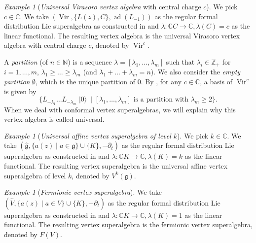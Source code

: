 \documentclass[a4paper, 12pt, reqno]{amsart}
\theoremstyle{remark}
\newtheorem{example}[theorem]{Example}
\numberwithin{equation}{subsection}
\DeclareMathOperator{\Vir}{Vir}
\DeclareMathOperator{\vac}{|0\rangle}
\DeclareMathOperator{\ad}{ad}
\begin{document}
\begin{example}[\emph{Universal Virasoro vertex algebra} with central charge $c$]
  \label{exa:5}
  We pick $c \in \mathbb{C}$.
  We take $(\Vir, \{L(z), C\}, \ad(L_{-1}))$ as the regular formal distribution Lie superalgebra as constructed in  and $\lambda: \mathbb{C}C \to \mathbb{C}, \lambda(C) = c$ as the linear functional.
  The resulting vertex algebra is the universal Virasoro vertex algebra with central charge $c$, denoted by $\Vir^c$.

  A \emph{partition} (of $n \in \mathbb{N}$) is a sequence $\lambda = [\lambda_1, \dots, \lambda_m]$ such that $\lambda_i \in \mathbb{Z}_+$ for $i = 1, \dots, m$, $\lambda_1 \ge \dots \ge \lambda_m$ (and $\lambda_1 + \dots + \lambda_m = n$).
  We also consider the \emph{empty partition} $\emptyset$, which is the unique partition of $0$.
  By , for any $c \in \mathbb{C}$, a basis of $\Vir^c$ is given by
  \begin{equation*}
    \{L_{-\lambda_1}\dots L_{-\lambda_m}\vac \mid [\lambda_1, \dots, \lambda_m]\text{ is a partition with }\lambda_m \ge 2\}.
  \end{equation*}
  When we deal with conformal vertex superalgebras, we will explain why this vertex algebra is called universal.
\end{example}

\begin{example}[\emph{Universal affine vertex superalgebra of level $k$}]
  \label{exa:6}
  We pick $k \in \mathbb{C}$.
  We take $(\hat{\mathfrak{g}}, \{a(z) \mid a \in \mathfrak{g}\} \cup \{K\}, -\partial_t)$ as the regular formal distribution Lie superalgebra as constructed in  and $\lambda: \mathbb{C}K \to \mathbb{C}, \lambda(K) = k$ as the linear functional.
  The resulting vertex superalgebra is the universal affine vertex superalgebra of level $k$, denoted by $V^k(\mathfrak{g})$.
\end{example}

\begin{example}[\emph{Fermionic vertex superalgebra}]
  \label{exa:7}
  We take $(\widehat{V}, \{a(z) \mid a \in V\} \cup \{K\}, -\partial_t)$ as the regular formal distribution Lie superalgebra as constructed in  and $\lambda: \mathbb{C}K \to \mathbb{C}, \lambda(K) = 1$ as the linear functional.
  The resulting vertex superalgebra is the fermionic vertex superalgebra, denoted by $F(V)$.
\end{example}
\end{document}
